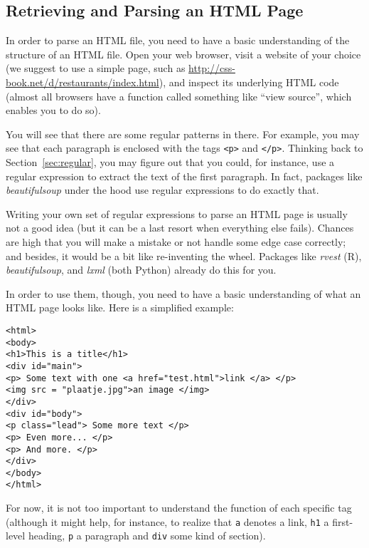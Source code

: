 \subsection{Retrieving and Parsing an HTML Page} \label{sec:parsehtml}

In order to parse an HTML file, you need to have a basic understanding
of the structure of an HTML file. Open your web browser, visit a
website of your choice (we suggest to use a simple page, such as
\url{http://css-book.net/d/restaurants/index.html}), and
 inspect its underlying HTML code (almost all browsers have a
function called something like ``view source'', which enables you to
do so).

You will see that there are some regular patterns in there. For
example, you may see that each paragraph is enclosed with the tags
\verb|<p>| and \verb|</p>|. Thinking back to Section~\ref{sec:regular}, you may figure out
that you could, for instance, use a regular expression to extract
the text of the first paragraph. In fact, packages like \emph{beautifulsoup}
under the hood use regular expressions to do exactly that.

Writing your own set of regular expressions to parse an HTML
page is usually not a good idea (but it can be a last resort when
everything else fails). Chances are high that you will make
a mistake or  not handle some edge case correctly; and besides,
it would be a bit like re-inventing the wheel. Packages like
\emph{rvest} (R), \emph{beautifulsoup}, and \emph{lxml} (both Python)
already do this for you.

In order to use them, though, you need to have a basic
understanding of what an HTML page looks like. Here is a simplified
example:

\begin{lstlisting}
<html>
<body>
<h1>This is a title</h1>
<div id="main">
<p> Some text with one <a href="test.html">link </a> </p>
<img src = "plaatje.jpg">an image </img>
</div>
<div id="body">
<p class="lead"> Some more text </p>
<p> Even more... </p>
<p> And more. </p>
</div>
</body>
</html>
\end{lstlisting}

For now, it is not too important to understand the function of each
specific tag (although it might help, for instance, to realize that
\texttt{a} denotes a link, \texttt{h1} a first-level heading,
\texttt{p} a paragraph and \texttt{div} some kind of section).


